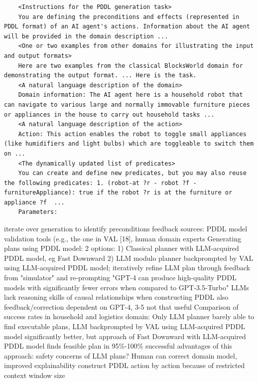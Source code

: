 \documentclass{article}
\begin{document}
\begin{verbatim}
	<Instructions for the PDDL generation task>
	You are defining the preconditions and effects (represented in PDDL format) of an AI agent's actions. Information about the AI agent will be provided in the domain description ... 
	<One or two examples from other domains for illustrating the input and output formats>
	Here are two examples from the classical BlocksWorld domain for demonstrating the output format. ... Here is the task. 
	<A natural language description of the domain> 
	Domain information: The AI agent here is a household robot that can navigate to various large and normally immovable furniture pieces or appliances in the house to carry out household tasks ... 
	<A natural language description of the action> 
	Action: This action enables the robot to toggle small appliances (like humidifiers and light bulbs) which are toggleable to switch them on ...  
	<The dynamically updated list of predicates> 
	You can create and define new predicates, but you may also reuse the following predicates: 1. (robot-at ?r - robot ?f - furnitureAppliance): true if the robot ?r is at the furniture or appliance ?f  ... 
	Parameters:
\end{verbatim}
iterate over generation to identify preconditions
feedback sources: PDDL model validation tools (e.g., the one in VAL [18], human domain experts
Generating plans using PDDL  model: 2 options:
1) Classical planner with LLM-acquired PDDL model, eg Fast Downward
2) LLM modulo planner backprompted by VAL using LLM-acquired PDDL model; iteratively refine LLM plan through feedback from "simulator" and re-prompting
"GPT-4 can produce high-quality PDDL models with significantly fewer errors when compared to GPT-3.5-Turbo"
LLMs lack reasoning skills of causal relationships when constructing PDDL
also feedback/correction dependent on GPT-4, 3-5 not that useful
Comparison of success rates in household and logistics domain: Only LLM planner barely able to find executable plans,  LLM backprompted by VAL using LLM-acquired PDDL model significantly better, but approach of Fast Downward with LLM-acquired PDDL model finds feasible plan in 95\%-100\% successful
advantages of this approach: safety concerns of LLM plans? Human can correct domain model, improved explainability
construct PDDL action by action because of restricted context window size



\end{document}
